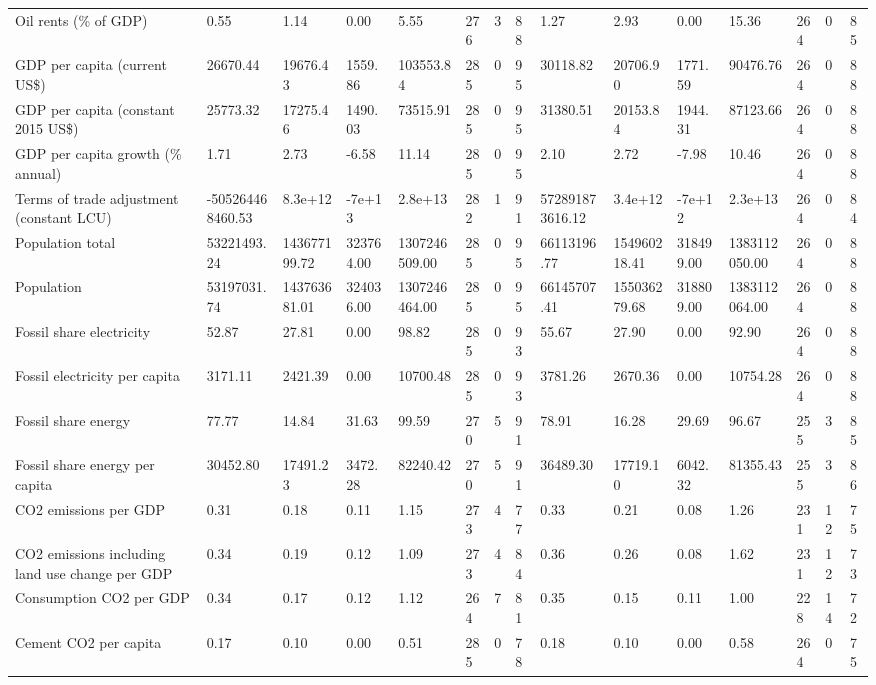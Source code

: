 \begin{longtable}{lllllllllllllll}
Oil rents (\% of GDP) & 0.55 & 1.14 & 0.00 & 5.55 & 276 & 3 & 88 & 1.27 & 2.93 & 0.00 & 15.36 & 264 & 0 & 85\\
GDP per capita (current US\$) & 26670.44 & 19676.43 & 1559.86 & 103553.84 & 285 & 0 & 95 & 30118.82 & 20706.90 & 1771.59 & 90476.76 & 264 & 0 & 88\\
GDP per capita (constant 2015 US\$) & 25773.32 & 17275.46 & 1490.03 & 73515.91 & 285 & 0 & 95 & 31380.51 & 20153.84 & 1944.31 & 87123.66 & 264 & 0 & 88\\
\addlinespace
GDP per capita growth (\% annual) & 1.71 & 2.73 & -6.58 & 11.14 & 285 & 0 & 95 & 2.10 & 2.72 & -7.98 & 10.46 & 264 & 0 & 88\\
Terms of trade adjustment (constant LCU) & -505264468460.53 & 8.3e+12 & -7e+13 & 2.8e+13 & 282 & 1 & 91 & 572891873616.12 & 3.4e+12 & -7e+12 & 2.3e+13 & 264 & 0 & 84\\
Population total & 53221493.24 & 143677199.72 & 323764.00 & 1307246509.00 & 285 & 0 & 95 & 66113196.77 & 154960218.41 & 318499.00 & 1383112050.00 & 264 & 0 & 88\\
Population & 53197031.74 & 143763681.01 & 324036.00 & 1307246464.00 & 285 & 0 & 95 & 66145707.41 & 155036279.68 & 318809.00 & 1383112064.00 & 264 & 0 & 88\\
Fossil share electricity & 52.87 & 27.81 & 0.00 & 98.82 & 285 & 0 & 93 & 55.67 & 27.90 & 0.00 & 92.90 & 264 & 0 & 88\\
\addlinespace
Fossil electricity per capita & 3171.11 & 2421.39 & 0.00 & 10700.48 & 285 & 0 & 93 & 3781.26 & 2670.36 & 0.00 & 10754.28 & 264 & 0 & 88\\
Fossil share energy & 77.77 & 14.84 & 31.63 & 99.59 & 270 & 5 & 91 & 78.91 & 16.28 & 29.69 & 96.67 & 255 & 3 & 85\\
Fossil share energy per capita & 30452.80 & 17491.23 & 3472.28 & 82240.42 & 270 & 5 & 91 & 36489.30 & 17719.10 & 6042.32 & 81355.43 & 255 & 3 & 86\\
CO2 emissions per GDP & 0.31 & 0.18 & 0.11 & 1.15 & 273 & 4 & 77 & 0.33 & 0.21 & 0.08 & 1.26 & 231 & 12 & 75\\
CO2 emissions including land use change per GDP & 0.34 & 0.19 & 0.12 & 1.09 & 273 & 4 & 84 & 0.36 & 0.26 & 0.08 & 1.62 & 231 & 12 & 73\\
\addlinespace
Consumption CO2 per GDP & 0.34 & 0.17 & 0.12 & 1.12 & 264 & 7 & 81 & 0.35 & 0.15 & 0.11 & 1.00 & 228 & 14 & 72\\
Cement CO2 per capita & 0.17 & 0.10 & 0.00 & 0.51 & 285 & 0 & 78 & 0.18 & 0.10 & 0.00 & 0.58 & 264 & 0 & 75\\

\end{longtable}
